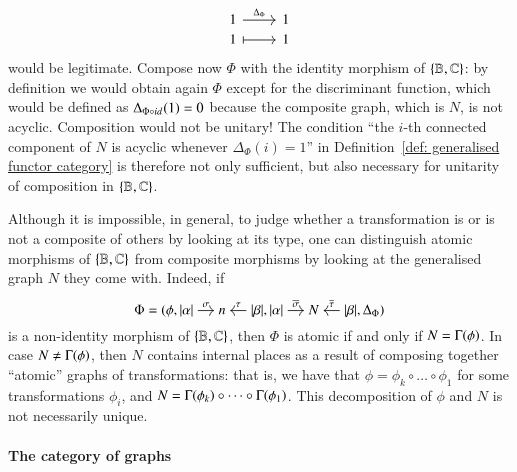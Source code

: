 \begin{remark}
    \[
    \begin{tikzcd}[row sep=0pt]
    1 \ar[r,"\Delta_\Phi"] & 1 \\
    1 \ar[r,|->] & 1
    \end{tikzcd}
    \] would be legitimate. Compose now $\Phi$ with the identity morphism of $\{ \mathbb B,\mathbb C\}$: by definition we would obtain again $\Phi$ except for the discriminant function, which would be defined as $\Delta_{\Phi \circ \mathop{\textit{id}_{}}}(1)=0$ because the composite graph, which is $N$, is not acyclic. Composition would not be unitary! The condition ``the $i$-th connected component of $N$ is acyclic whenever $\Delta_\Phi(i)=1$'' in Definition~\ref{def: generalised functor category} is therefore not only sufficient, but also necessary for unitarity of composition in $\{ \mathbb B,\mathbb C\}$.
    
\end{remark}

\begin{remark}\label{remark:non-atomic morphisms of {B,C}}
    Although it is impossible, in general, to judge whether a transformation is or is not a composite of others by looking at its type, one can distinguish atomic morphisms of $\{ \mathbb B,\mathbb C\}$ from composite morphisms by looking at the generalised graph $N$ they come  with. Indeed, if 
    \[
    \Phi = (\phi,
    \begin{tikzcd}[cramped,sep=small]
    \length\alpha \ar[r,"\sigma"] & n & \length\beta \ar[l,"\tau"']
    \end{tikzcd},
    \begin{tikzcd}[cramped,sep=small]
    \length\alpha \ar[r,"\overline\sigma"] & N & \length\beta \ar[l,"\overline\tau"']
    \end{tikzcd},
    \Delta_\Phi
    )
    \]
    is a non-identity morphism of $\{ \mathbb B,\mathbb C\}$, then $\Phi$ is atomic if and only if $N=\graph\phi$. In case $N \ne \graph\phi$, then $N$ contains internal places as a result of composing together ``atomic'' graphs of transformations: that is, we have that $\phi = \phi_k \circ \dots \circ \phi_1$ for some transformations $\phi_i$, and $N=\graph{\phi_k} \circ \dots \circ \graph{\phi_1}$. This decomposition of $\phi$ and $N$ is not necessarily unique.
\end{remark}

\paragraph{The category of graphs}

